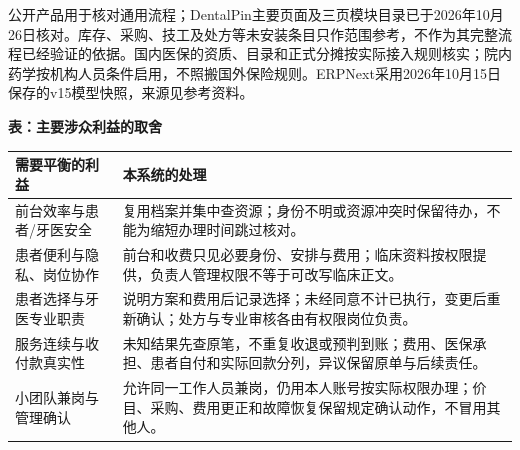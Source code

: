 \documentclass[UTF8,a4paper,zihao=-4,fontset=none]{ctexart}
\begin{document}
\medskip
公开产品用于核对通用流程；DentalPin主要页面及三页模块目录已于2026年10月26日核对。库存、采购、技工及处方等未安装条目只作范围参考，不作为其完整流程已经验证的依据。国内医保的资质、目录和正式分摊按实际接入规则核实；院内药学按机构人员条件启用，不照搬国外保险规则。ERPNext采用2026年10月15日保存的v15模型快照，来源见参考资料。\par\smallskip
{\setlength{\tabcolsep}{3pt}\renewcommand{\arraystretch}{1.08}
\noindent\textbf{表\thetable：主要涉众利益的取舍}\par\smallskip
\noindent\begin{tabular}{@{}>{\raggedright\arraybackslash}p{4.1cm}>{\raggedright\arraybackslash}p{11.6cm}@{}}
\toprule
需要平衡的利益 & 本系统的处理 \\ \midrule
前台效率与患者/牙医安全 & 复用档案并集中查资源；身份不明或资源冲突时保留待办，不能为缩短办理时间跳过核对。 \\
患者便利与隐私、岗位协作 & 前台和收费只见必要身份、安排与费用；临床资料按权限提供，负责人管理权限不等于可改写临床正文。 \\
患者选择与牙医专业职责 & 说明方案和费用后记录选择；未经同意不计已执行，变更后重新确认；处方与专业审核各由有权限岗位负责。 \\
服务连续与收付款真实性 & 未知结果先查原笔，不重复收退或预判到账；费用、医保承担、患者自付和实际回款分列，异议保留原单与后续责任。 \\
小团队兼岗与管理确认 & 允许同一工作人员兼岗，仍用本人账号按实际权限办理；价目、采购、费用更正和故障恢复保留规定确认动作，不冒用其他人。 \\
\bottomrule
\end{tabular}\par}
\medskip
\endgroup
\clearpage
\end{document}
